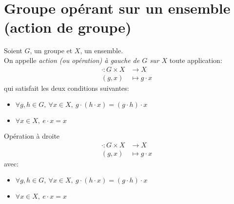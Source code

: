 \documentclass[../main.tex]{subfile}
\begin{document}
\section{Groupe opérant sur un ensemble (action de groupe)}

\begin{defi}
	Soient $G$, un groupe et $X$, un ensemble.\\
	On appelle \emph{action (ou opération) à gauche de $G$ sur $X$} toute application:
	$$
\begin{aligned}
	\cdot : G \times X &\to X\\
	(g, x) &\mapsto g \cdot x
\end{aligned}
	$$
	qui satisfait les deux conditions suivantes:\\
\begin{itemize}	
	\item $\forall g, h \in G, \ \forall x \in X, \ g \cdot (h \cdot x) = (g \cdot h) \cdot x$
	\item $\forall x \in X, \ e \cdot x = x$
\end{itemize}
\end{defi}

\begin{defi}{Opération à droite}
	$$
\begin{aligned}
	\cdot : G \times X &\to X\\
	(g, x) &\mapsto g \cdot x
\end{aligned}
	$$
	avec:\\
\begin{itemize}	
	\item $\forall g, h \in G, \ \forall x \in X, \ g \cdot (h \cdot x) = (g \cdot h) \cdot x$
	\item $\forall x \in X, \ e \cdot x = x$
\end{itemize}
\end{defi}
\end{document}
